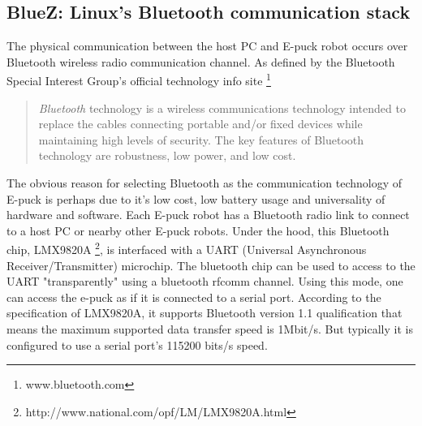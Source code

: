 \subsection{BlueZ: Linux's Bluetooth communication stack}
\label{expt-tools:bluez}
The physical communication between the host PC and E-puck robot occurs over Bluetooth wireless radio communication channel.  As defined by the Bluetooth Special Interest Group's official technology  info site \footnote{www.bluetooth.com}
 \begin{quote}
{\em Bluetooth} technology is a wireless communications technology intended to replace the cables connecting portable and/or fixed devices while maintaining high levels of security. The key features of Bluetooth technology are robustness, low power, and low cost.
 \end{quote}
The obvious reason for selecting Bluetooth as the communication technology of E-puck is perhaps   due to it's low cost, low battery usage and universality of hardware and software. Each E-puck robot has a Bluetooth radio link to connect to a host PC or nearby other E-puck robots. Under the hood,  this Bluetooth  chip, LMX9820A \footnote{http://www.national.com/opf/LM/LMX9820A.html},   is  interfaced with a UART (Universal Asynchronous Receiver/Transmitter)  microchip. The bluetooth chip can be used to access to the UART "transparently" using a bluetooth rfcomm channel. Using this mode, one can access the e-puck as if it is connected to a serial port.  According to the specification of LMX9820A, it supports Bluetooth version 1.1 qualification that means the maximum supported data transfer speed is 1Mbit/s. But typically it is configured to use a serial port's 115200 bits/s speed. 

